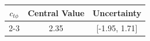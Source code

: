 \begin{tabular}{|c|c|c|}
\hline
\multirow{2}{*}{\textbf{$c_{t\phi}$}} & \textbf{Central Value} & \textbf{Uncertainty} \\
\cline{2-3}
&  2.35 & [-1.95, 1.71]\\
\hline
\end{tabular}